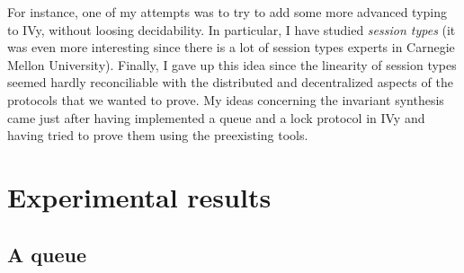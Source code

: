 \documentclass[11pt,a4paper,oldfontcommands,openany]{memoir}
\begin{document}
    For instance, one of my attempts was to try to add some more advanced typing to IVy, without loosing decidability.
    In particular, I have studied \textit{session types} (it was even more interesting since there is a lot of session types experts in Carnegie Mellon University).
    Finally, I gave up this idea since the linearity of session types seemed hardly reconciliable with the distributed and decentralized aspects of the protocols
    that we wanted to prove. My ideas concerning the invariant synthesis came just after having implemented a queue and a lock protocol in IVy and having tried to prove them using the preexisting tools.




\appendix 
\chapter{Experimental results}

    \section{A queue}
\end{document}
